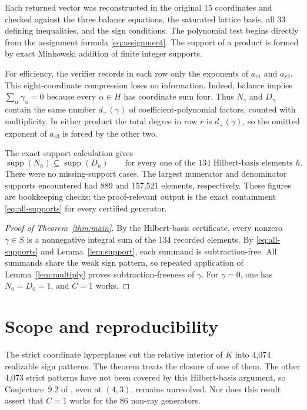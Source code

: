\documentclass[11pt]{article}
\theoremstyle{definition}
\newcommand{\supp}{\operatorname{supp}}
\begin{document}
Each returned vector was reconstructed in the original 15 coordinates and
checked against the three balance equations, the saturated lattice basis,
all 33 defining inequalities, and the sign conditions.  The polynomial
test begins directly from the assignment formula \eqref{eq:assignment}.
The support of a product is formed by exact Minkowski addition of finite
integer supports.

For efficiency, the verifier records in each row only the exponents of
$a_{r1}$ and $a_{r2}$.  This eight-coordinate compression loses no
information.  Indeed, balance implies
\(
 \sum_\alpha\gamma_\alpha=0
\)
because every $\alpha\in H$ has coordinate sum four.  Thus $N_\gamma$ and
$D_\gamma$ contain the same number $d_+(\gamma)$ of coefficient-polynomial
factors, counted with multiplicity.  In either product the total degree in
row $r$ is $d_+(\gamma)$, so the omitted exponent of $a_{r3}$ is forced by
the other two.

The exact support calculation gives
\begin{equation}\label{eq:all-supports}
 \supp(N_h)\subseteq\supp(D_h)
 \qquad\text{for every one of the 134 Hilbert-basis elements }h.
\end{equation}
There were no missing-support cases.  The largest numerator and denominator
supports encountered had 889 and 157,521 elements, respectively.  These
figures are bookkeeping checks; the proof-relevant output is the exact
containment \eqref{eq:all-supports} for every certified generator.

\begin{proof}[Proof of Theorem~\ref{thm:main}]
By the Hilbert-basis certificate, every nonzero $\gamma\in S$ is a
nonnegative integral sum of the 134 recorded elements.  By
\eqref{eq:all-supports} and Lemma~\ref{lem:support}, each summand is
subtraction-free.  All summands share the weak sign pattern, so repeated
application of Lemma~\ref{lem:multiply} proves subtraction-freeness of
$\gamma$.  For $\gamma=0$, one has $N_0=D_0=1$, and $C=1$ works.
\end{proof}

\section{Scope and reproducibility}

The strict coordinate hyperplanes cut the relative interior of $K$ into
4,074 realizable sign patterns.  The theorem treats the closure of one of
them.  The other 4,073 strict patterns have not been covered by this
Hilbert-basis argument, so Conjecture~9.2 of
\cite{BathijaRohatgiSoskin2026}, even at $(4,3)$, remains unresolved.  Nor
does this result assert that $C=1$ works for the 86 non-ray generators.
\end{document}
